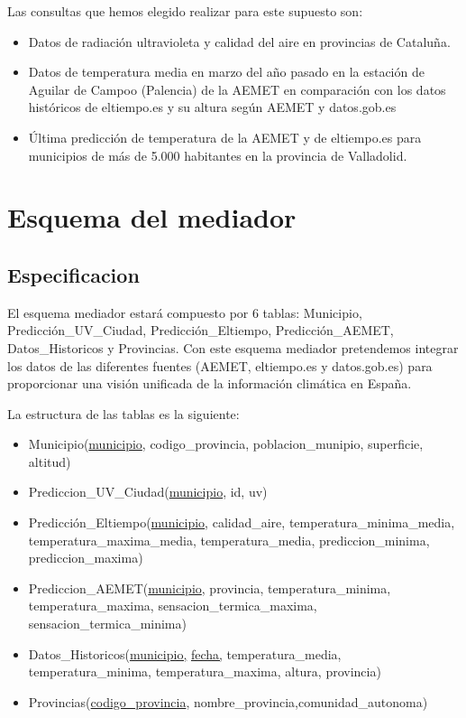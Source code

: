\documentclass[12pt, a4paper]{article}
\begin{document}
Las consultas que hemos elegido realizar para este supuesto son:
\begin{itemize}
    \item Datos de radiación ultravioleta y calidad del aire en provincias de Cataluña.
    \item Datos de temperatura media en marzo del año pasado en la estación de Aguilar de Campoo (Palencia) de la AEMET en comparación con los datos históricos de eltiempo.es y su altura según AEMET y datos.gob.es
    \item Última predicción de temperatura de la AEMET y de eltiempo.es para municipios de más de 5.000 habitantes en la provincia de Valladolid.
\end{itemize}

\section{Esquema del mediador}
\subsection{Especificacion}
El esquema mediador estará compuesto por 6 tablas: Municipio, Predicción\_UV\_Ciudad, Predicción\_Eltiempo, Predicción\_AEMET, Datos\_Historicos y Provincias.
Con este esquema mediador pretendemos integrar los datos de las diferentes fuentes (AEMET, eltiempo.es y datos.gob.es) para proporcionar una visión unificada de la información climática en España.

La estructura de las tablas es la siguiente:
\begin{itemize}
    \item Municipio(\underline{municipio}, codigo\_provincia, poblacion\_munipio, superficie, altitud)
    \item Prediccion\_UV\_Ciudad(\underline{municipio}, id, uv)
    \item Predicción\_Eltiempo(\underline{municipio}, calidad\_aire, temperatura\_minima\_media, temperatura\_maxima\_media, temperatura\_media, prediccion\_minima, prediccion\_maxima)
    \item Prediccion\_AEMET(\underline{municipio}, provincia, temperatura\_minima, temperatura\_maxima, sensacion\_termica\_maxima, sensacion\_termica\_minima)
    \item Datos\_Historicos(\underline{municipio,} \underline{fecha,} temperatura\_media, temperatura\_minima, temperatura\_maxima, altura, provincia)
    \item Provincias(\underline{codigo\_provincia}, nombre\_provincia,comunidad\_autonoma)
\end{itemize}
\end{document}
